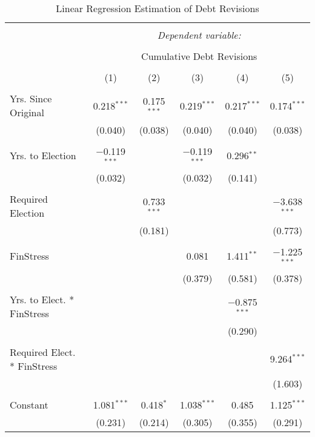 
\begin{table}[!htbp] \centering 
  \caption{Linear Regression Estimation of Debt Revisions} 
  \label{debt_results} 
\tiny 
\begin{tabular}{@{\extracolsep{5pt}}lccccc} 
\\[-1.8ex]\hline 
\hline \\[-1.8ex] 
 & \multicolumn{5}{c}{\textit{Dependent variable:}} \\ 
\cline{2-6} 
\\[-1.8ex] & \multicolumn{5}{c}{Cumulative Debt Revisions} \\ 
\\[-1.8ex] & (1) & (2) & (3) & (4) & (5)\\ 
\hline \\[-1.8ex] 
 Yrs. Since Original & 0.218$^{***}$ & 0.175$^{***}$ & 0.219$^{***}$ & 0.217$^{***}$ & 0.174$^{***}$ \\ 
  & (0.040) & (0.038) & (0.040) & (0.040) & (0.038) \\ 
  & & & & & \\ 
 Yrs. to Election & $-$0.119$^{***}$ &  & $-$0.119$^{***}$ & 0.296$^{**}$ &  \\ 
  & (0.032) &  & (0.032) & (0.141) &  \\ 
  & & & & & \\ 
 Required Election &  & 0.733$^{***}$ &  &  & $-$3.638$^{***}$ \\ 
  &  & (0.181) &  &  & (0.773) \\ 
  & & & & & \\ 
 FinStress &  &  & 0.081 & 1.411$^{**}$ & $-$1.225$^{***}$ \\ 
  &  &  & (0.379) & (0.581) & (0.378) \\ 
  & & & & & \\ 
 Yrs. to Elect. * FinStress &  &  &  & $-$0.875$^{***}$ &  \\ 
  &  &  &  & (0.290) &  \\ 
  & & & & & \\ 
 Required Elect. * FinStress &  &  &  &  & 9.264$^{***}$ \\ 
  &  &  &  &  & (1.603) \\ 
  & & & & & \\ 
 Constant & 1.081$^{***}$ & 0.418$^{*}$ & 1.038$^{***}$ & 0.485 & 1.125$^{***}$ \\ 
  & (0.231) & (0.214) & (0.305) & (0.355) & (0.291) \\ 

\end{tabular}
\end{table}
